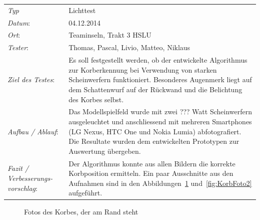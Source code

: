 \begin{tabular}{p{3.6cm}p{\textwidth-3.6cm-0.7cm}}
	\rule{0pt}{11pt}\textit{Typ}              & Lichttest  \\ 
	\rule{0pt}{11pt}\textit{Datum}:           & 04.12.2014   \\
	\rule{0pt}{11pt}\textit{Ort}:             & Teaminseln, Trakt 3 HSLU \\
	\rule{0pt}{11pt}\textit{Tester}:          & Thomas, Pascal, Livio, Matteo, Niklaus\\
	\rule{0pt}{11pt}\textit{Ziel des Testes}: & Es soll festgestellt werden, ob der entwickelte 
	Algorithmus zur Korberkennung bei Verwendung von starken Scheinwerfern funktioniert. Besonderes Augenmerk liegt auf dem Schattenwurf auf der Rückwand und die Belichtung des Korbes selbst. \\
	\rule{0pt}{11pt}\textit{Aufbau / Ablauf}: & Das Modellspielfeld wurde mit zwei ??? Watt 
	Scheinwerfern ausgeleuchtet und anschliessend mit mehreren Smartphones (LG Nexus, HTC One 
	und Nokia Lumia) abfotografiert. Die Resultate wurden dem entwickelten Prototypen zur Auswertung übergeben. 
	\\
	\rule{0pt}{11pt}\textit{Fazit / Verbesserungs-\newline vorschlag}: & Der Algorithmus konnte 
	aus allen Bildern die korrekte Korbposition ermitteln. Ein paar Ausschnitte aus den Aufnahmen 
	sind in den Abbildungen~\ref{fig:KorbFoto1} und~\ref{fig:KorbFoto2} aufgeführt. \\
\end{tabular}
%
\vspace{0.2cm}
%
\begin{figure}[h!]
\hfill
{}
\caption{Fotos des Korbes, der am Rand steht}
\label{fig:KorbFoto1}
\end{figure}

